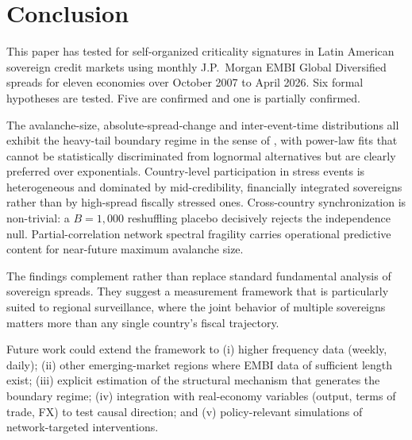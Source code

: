 \documentclass[12pt,a4paper]{article}
\begin{document}
\section{Conclusion}
\label{sec:conclusion}

This paper has tested for self-organized criticality signatures in Latin
American sovereign credit markets using monthly J.P.~Morgan EMBI Global
Diversified spreads for eleven economies over October 2007 to April 2026.
Six formal hypotheses are tested. Five are confirmed and one is partially
confirmed.

The avalanche-size, absolute-spread-change and inter-event-time
distributions all exhibit the heavy-tail boundary regime in the sense of
\citet{StumpfPorter2012}, with power-law fits that cannot be statistically
discriminated from lognormal alternatives but are clearly preferred over
exponentials. Country-level participation in stress events is heterogeneous
and dominated by mid-credibility, financially integrated sovereigns rather
than by high-spread fiscally stressed ones. Cross-country synchronization
is non-trivial: a $B=1{,}000$ reshuffling placebo decisively rejects the
independence null. Partial-correlation network spectral fragility carries
operational predictive content for near-future maximum avalanche size.

The findings complement rather than replace standard fundamental analysis
of sovereign spreads. They suggest a measurement framework that is
particularly suited to regional surveillance, where the joint behavior of
multiple sovereigns matters more than any single country's fiscal
trajectory.

Future work could extend the framework to (i) higher frequency data
(weekly, daily); (ii) other emerging-market regions where EMBI data of
sufficient length exist; (iii) explicit estimation of the structural
mechanism that generates the boundary regime; (iv) integration with
real-economy variables (output, terms of trade, FX) to test causal
direction; and (v) policy-relevant simulations of network-targeted
interventions.


\end{document}
